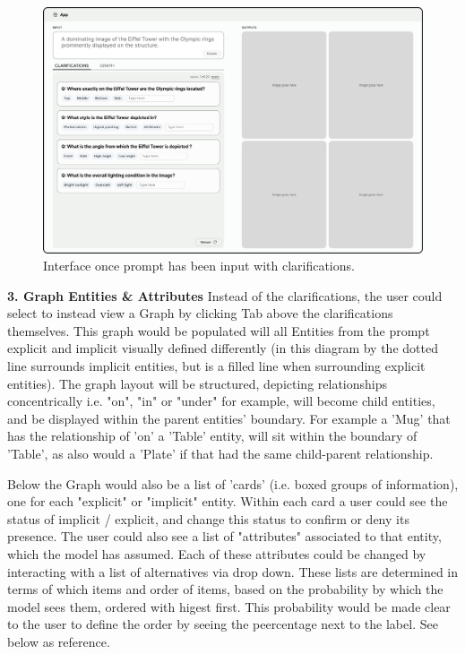 \begin{figure} [ht!]
    \centering
    \includegraphics[width=.9\linewidth]{figures/Clarifications.pdf}
    \caption{Interface once prompt has been input with clarifications.}
    \label{fig:interface2}
\end{figure} 

\textbf{3. Graph Entities \& Attributes }
Instead of the clarifications, the user could select to instead view a Graph by clicking  Tab above the clarifications themselves. This graph would  be populated will all Entities from the prompt explicit and implicit visually defined differently (in this diagram by the dotted line surrounds implicit entities, but is a filled line when surrounding explicit entities). The graph layout will be structured, depicting relationships concentrically i.e. "on", "in" or "under" for example, will become child entities, and be displayed within the parent entities' boundary. For example a 'Mug' that has the relationship of 'on' a 'Table' entity, will sit within the boundary of 'Table', as also would a 'Plate' if that had the same child-parent relationship. 

Below the Graph would also be a list of 'cards' (i.e. boxed groups of information), one for each "explicit" or "implicit" entity. Within each card a user could see the status of implicit / explicit, and change this status to confirm or deny its presence. The user could also see a list of "attributes" associated to that entity, which the model has assumed. Each of these attributes could be changed by interacting with a list of alternatives via drop down. These lists are determined in terms of which items and order of items, based on the probability by which the model sees them, ordered with higest first. This probability would be made clear to the user to define the order by seeing the peercentage next to the label. See  below as reference.

